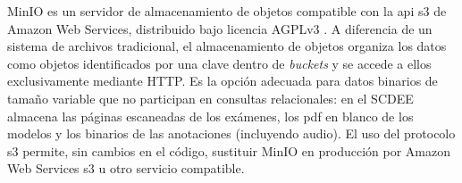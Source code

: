 MinIO es un servidor de almacenamiento de objetos compatible con la
\ac{api} \ac{s3} de Amazon Web Services, distribuido bajo licencia AGPLv3
\cite{minio}. A diferencia de un sistema de archivos tradicional, el
almacenamiento de objetos organiza los datos como objetos identificados
por una clave dentro de \textit{buckets} y se accede a ellos
exclusivamente mediante HTTP. Es la opción adecuada para datos binarios
de tamaño variable que no participan en consultas relacionales: en el
SCDEE almacena las páginas escaneadas de los exámenes, los \acs{pdf} en
blanco de los modelos y los binarios de las anotaciones (incluyendo
audio). El uso del protocolo \acs{s3} permite, sin cambios en el código,
sustituir MinIO en producción por Amazon Web Services \acs{s3} u otro
servicio compatible.
